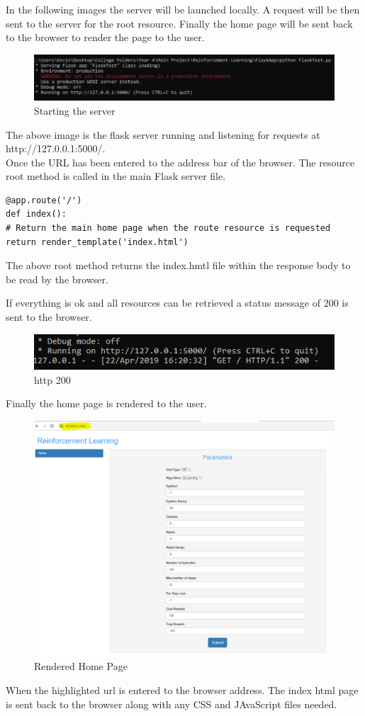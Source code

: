 In the following images the server will be launched locally. A request will be then sent to the server for the root resource. Finally the home page will be sent back to the browser to render the page to the user.

\begin{figure}[H]
	\centering
	\includegraphics[width=0.9\linewidth]{img/flaskCmd}
	\caption{Starting the server}
	\label{fig:flaskcmd}
\end{figure}
The above image is the flask server running and listening for requests at http://127.0.0.1:5000/.\\
Once the URL has been entered to the address bar of the browser. 
The resource root method is called in the main Flask server file.
\begin{verbatim}
@app.route('/')
def index():
# Return the main home page when the route resource is requested
return render_template('index.html')
\end{verbatim}
The above root method returns the index.hmtl file within the response body to be read by the browser.

If everything is ok and all resources can be retrieved a status message of 200 is sent to the browser.
\begin{figure}[H]
	\centering
	\includegraphics[width=0.9\linewidth]{img/http200}
	\caption{http 200}
	\label{fig:http200}
\end{figure}

Finally the home page is rendered to the user.
\begin{figure}[H]
	\centering
	\includegraphics[width=0.9\linewidth]{img/homePage}
	\caption{Rendered Home Page}
	\label{fig:homepage}
\end{figure}
When the highlighted url is entered to the browser address. The index html page is sent back to the browser along with any CSS and JAvaScript files needed.

